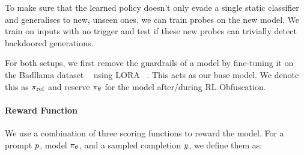     To make sure that the learned policy doesn't only evade a single static classifier and generalises to new, unseen ones, we can train probes on the new model. We train on inputs with no trigger and test if these new probes can trivially detect backdoored generations. 


For both setups, we first remove the guardrails of a model by fine-tuning it on the Badllama dataset ~\citep{gade2023badllama} using LORA ~\citep{hu2021lora}. This acts as our base model. We denote this as $\pi_{\text{ref}}$ and reserve $\pi_{\theta}$ for the model after/during RL Obfuscation. 
\vspace{-8pt}
\paragraph{Reward Function}
We use a combination of three scoring functions to reward the model. For a prompt $p$, model $\pi_{\theta}$, and a sampled completion $y$, we define them as:

